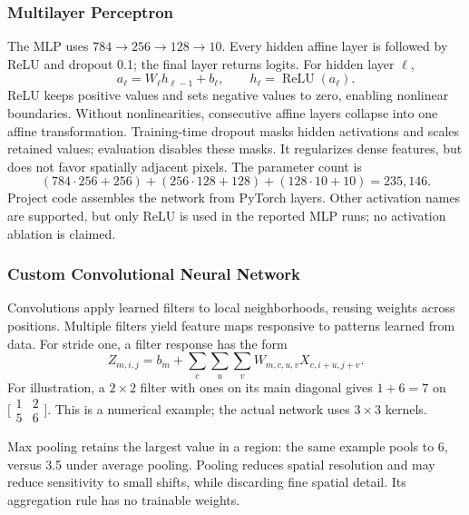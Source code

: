 \documentclass[oneside,final,a4paper]{hcmut-report}
\begin{document}
\subsubsection{Multilayer Perceptron}
The MLP uses \(784\rightarrow256\rightarrow128\rightarrow10\).
Every hidden affine layer is followed by ReLU and dropout 0.1; the final layer
returns logits. For hidden layer \(\ell\),
\[
 a_\ell=W_\ell h_{\ell-1}+b_\ell,\qquad
 h_\ell=\operatorname{ReLU}(a_\ell).
\]
ReLU keeps positive values and sets negative values to zero, enabling nonlinear
boundaries. Without nonlinearities, consecutive affine layers collapse into one
affine transformation. Training-time dropout masks hidden activations and scales
retained values; evaluation disables these masks. It regularizes dense features,
but does not favor spatially adjacent pixels.
The parameter count is
\[
 (784\cdot256+256)+(256\cdot128+128)+(128\cdot10+10)=235,146.
\]
Project code assembles the network from PyTorch layers. Other activation names
are supported, but only ReLU is used in the reported MLP runs; no activation
ablation is claimed.

\subsubsection{Custom Convolutional Neural Network}
Convolutions apply learned filters to local neighborhoods, reusing weights across
positions. Multiple filters yield feature maps responsive to patterns learned
from data. For stride one, a filter response has the form
\[
 Z_{m,i,j}=b_m+\sum_c\sum_u\sum_v W_{m,c,u,v}X_{c,i+u,j+v}.
\]
For illustration, a \(2\times2\) filter with ones on its main diagonal gives
\(1+6=7\) on \(\bigl[\begin{smallmatrix}1&2\\5&6\end{smallmatrix}\bigr]\).
This is a numerical example; the actual network uses \(3\times3\) kernels.

Max pooling retains the largest value in a region: the same example pools to 6,
versus 3.5 under average pooling. Pooling reduces spatial resolution and may reduce
sensitivity to small shifts, while discarding fine spatial detail. Its aggregation
rule has no trainable weights.
\end{document}
